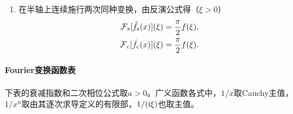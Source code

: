 \begin{enumerate}
\begin{subequations}
\begin{align}
				\FT_\cosine[f(kx)](\xi) = \frac1k\hat f_\cosine\Bigp{\frac\xi{k}}.
			\end{align}
\end{subequations}
	\item 在半轴上连续施行两次同种变换，由反演公式得（$\xi > 0$）\begin{subequations}
		\label{eq:mmp-half-line-inversion}
		\begin{align}
				\operatorname{\mathcal{F}}_\mathrm s[\hat f_\mathrm s(x)](\xi) &= \frac\pi{2}f(\xi),\\
				\operatorname{\mathcal{F}}_\mathrm c[\hat f_\mathrm c(x)](\xi) &= \frac\pi{2}f(\xi).
			\end{align}
\end{subequations}
\end{enumerate}
\paragraph{Fourier变换函数表}
下表的衰减指数和二次相位公式取$a > 0$。广义函数各式中，$1/x$取Cauchy主值，$1/x^n$取由其逐次求导定义的有限部，$1/(\mathrm{i}\xi)$也取主值。
